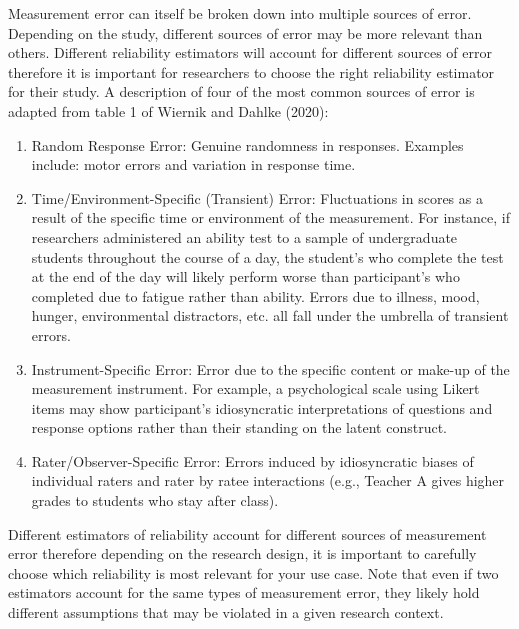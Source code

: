 \documentclass[
  letterpaper,
  DIV=11,
  numbers=noendperiod]{scrreprt}
\begin{document}
Measurement error can itself be broken down into multiple sources of
error. Depending on the study, different sources of error may be more
relevant than others. Different reliability estimators will account for
different sources of error therefore it is important for researchers to
choose the right reliability estimator for their study. A description of
four of the most common sources of error is adapted from table 1 of
Wiernik and Dahlke (2020):

\begin{enumerate}
\def\labelenumi{\arabic{enumi}.}
\item
  Random Response Error: Genuine randomness in responses. Examples
  include: motor errors and variation in response time.
\item
  Time/Environment-Specific (Transient) Error: Fluctuations in scores as
  a result of the specific time or environment of the measurement. For
  instance, if researchers administered an ability test to a sample of
  undergraduate students throughout the course of a day, the student's
  who complete the test at the end of the day will likely perform worse
  than participant's who completed due to fatigue rather than ability.
  Errors due to illness, mood, hunger, environmental distractors, etc.
  all fall under the umbrella of transient errors.
\item
  Instrument-Specific Error: Error due to the specific content or
  make-up of the measurement instrument. For example, a psychological
  scale using Likert items may show participant's idiosyncratic
  interpretations of questions and response options rather than their
  standing on the latent construct.
\item
  Rater/Observer-Specific Error: Errors induced by idiosyncratic biases
  of individual raters and rater by ratee interactions (e.g., Teacher A
  gives higher grades to students who stay after class).
\end{enumerate}

Different estimators of reliability account for different sources of
measurement error therefore depending on the research design, it is
important to carefully choose which reliability is most relevant for
your use case. Note that even if two estimators account for the same
types of measurement error, they likely hold different assumptions that
may be violated in a given research context.
\end{document}
